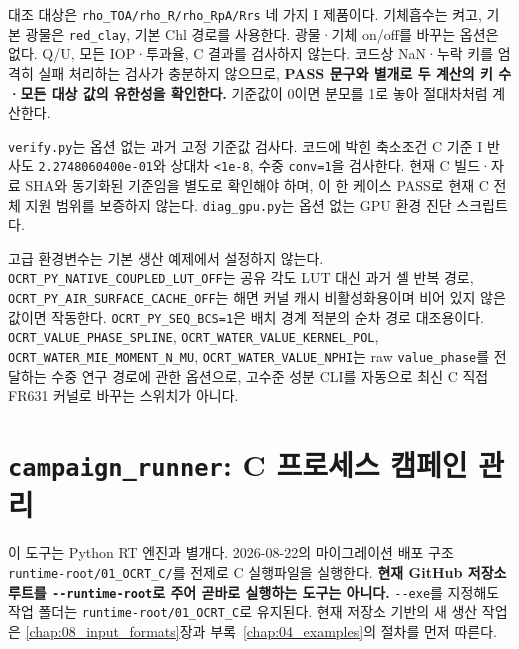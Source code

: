 대조 대상은 \texttt{rho\_\allowbreak{}TOA/\allowbreak{}rho\_\allowbreak{}R/\allowbreak{}rho\_\allowbreak{}RpA/\allowbreak{}Rrs} 네 가지 I 제품이다. 기체흡수는 켜고, 기본 광물은 \texttt{red\_\allowbreak{}clay}, 기본 Chl 경로를 사용한다. 광물·기체 on/off를 바꾸는 옵션은 없다. Q/U, 모든 IOP·투과율, C 결과를 검사하지 않는다. 코드상 NaN·누락 키를 엄격히 실패 처리하는 검사가 충분하지 않으므로, \textbf{PASS 문구와 별개로 두 계산의 키 수·모든 대상 값의 유한성을 확인한다.} 기준값이 0이면 분모를 1로 놓아 절대차처럼 계산한다.

\texttt{verify.\allowbreak{}py}는 옵션 없는 과거 고정 기준값 검사다. 코드에 박힌 축소조건 C 기준 I 반사도 \texttt{2.\allowbreak{}2748060400e-\allowbreak{}01}와 상대차 \texttt{<1e-\allowbreak{}8}, 수중 \texttt{conv=\allowbreak{}1}을 검사한다. 현재 C 빌드·자료 SHA와 동기화된 기준임을 별도로 확인해야 하며, 이 한 케이스 PASS로 현재 C 전체 지원 범위를 보증하지 않는다. \texttt{diag\_\allowbreak{}gpu.\allowbreak{}py}는 옵션 없는 GPU 환경 진단 스크립트다.

고급 환경변수는 기본 생산 예제에서 설정하지 않는다. \texttt{OCRT\_\allowbreak{}PY\_\allowbreak{}NATIVE\_\allowbreak{}COUPLED\_\allowbreak{}LUT\_\allowbreak{}OFF}는 공유 각도 LUT 대신 과거 셀 반복 경로, \texttt{OCRT\_\allowbreak{}PY\_\allowbreak{}AIR\_\allowbreak{}SURFACE\_\allowbreak{}CACHE\_\allowbreak{}OFF}는 해면 커널 캐시 비활성화용이며 비어 있지 않은 값이면 작동한다. \texttt{OCRT\_\allowbreak{}PY\_\allowbreak{}SEQ\_\allowbreak{}BCS=\allowbreak{}1}은 배치 경계 적분의 순차 경로 대조용이다. \texttt{OCRT\_\allowbreak{}VALUE\_\allowbreak{}PHASE\_\allowbreak{}SPLINE}, \texttt{OCRT\_\allowbreak{}WATER\_\allowbreak{}VALUE\_\allowbreak{}KERNEL\_\allowbreak{}POL}, \texttt{OCRT\_\allowbreak{}WATER\_\allowbreak{}MIE\_\allowbreak{}MOMENT\_\allowbreak{}N\_\allowbreak{}MU}, \texttt{OCRT\_\allowbreak{}WATER\_\allowbreak{}VALUE\_\allowbreak{}NPHI}는 raw \texttt{value\_\allowbreak{}phase}를 전달하는 수중 연구 경로에 관한 옵션으로, 고수준 성분 CLI를 자동으로 최신 C 직접 FR631 커널로 바꾸는 스위치가 아니다.

\section{\texttt{campaign\_\allowbreak{}runner}: C 프로세스 캠페인 관리}
\label{sec:auto:06_python_batch:10}
이 도구는 Python RT 엔진과 별개다. 2026-08-22의 마이그레이션 배포 구조 \texttt{runtime-\allowbreak{}root/\allowbreak{}01\_\allowbreak{}OCRT\_\allowbreak{}C/\allowbreak{}}를 전제로 C 실행파일을 실행한다. \textbf{현재 GitHub 저장소 루트를 \texttt{-\allowbreak{}-\allowbreak{}runtime-\allowbreak{}root}로 주어 곧바로 실행하는 도구는 아니다.} \texttt{-\allowbreak{}-\allowbreak{}exe}를 지정해도 작업 폴더는 \texttt{runtime-\allowbreak{}root/\allowbreak{}01\_\allowbreak{}OCRT\_\allowbreak{}C}로 유지된다. 현재 저장소 기반의 새 생산 작업은 \ref{chap:08_input_formats}장과 부록~\ref{chap:04_examples}의 절차를 먼저 따른다.


